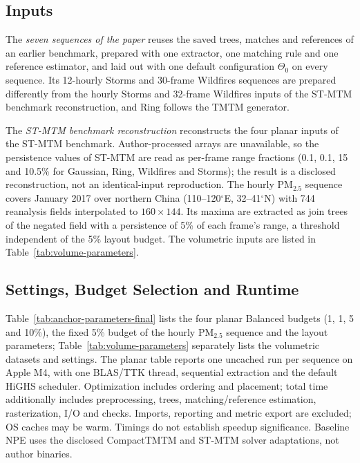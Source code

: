 \documentclass[preprint]{vgtc}   %
\begin{document}
\subsection{Inputs}\label{sec:dataprep}
The \emph{seven sequences of the paper} reuses the saved trees, matches and references of an earlier benchmark, prepared with one extractor, one matching rule and one reference estimator, and laid out with one default configuration $\Theta_0$ on every sequence. Its 12-hourly Storms and 30-frame Wildfires sequences are prepared differently from the hourly Storms and 32-frame Wildfires inputs of the ST-MTM benchmark reconstruction, and Ring follows the TMTM generator.

The \emph{ST-MTM benchmark reconstruction} reconstructs the four planar inputs of the ST-MTM benchmark. Author-processed arrays are unavailable, so the persistence values of ST-MTM are read as per-frame range fractions (0.1, 0.1, 15 and 10.5\% for Gaussian, Ring, Wildfires and Storms); the result is a disclosed reconstruction, not an identical-input reproduction. The hourly PM$_{2.5}$ sequence covers January 2017 over northern China (110--120$^\circ$E, 32--41$^\circ$N) with 744 reanalysis fields interpolated to $160\times144$. Its maxima are extracted as join trees of the negated field with a persistence of 5\% of each frame's range, a threshold independent of the 5\% layout budget. The volumetric inputs are listed in Table~\ref{tab:volume-parameters}.



\subsection{Settings, Budget Selection and Runtime}\label{sec:settings}


Table~\ref{tab:anchor-parameters-final} lists the four planar Balanced budgets (1, 1, 5 and 10\%), the fixed 5\% budget of the hourly PM$_{2.5}$ sequence and the layout parameters; Table~\ref{tab:volume-parameters} separately lists the volumetric datasets and settings. The planar table reports one uncached run per sequence on Apple M4, with one BLAS/TTK thread, sequential extraction and the default HiGHS scheduler. Optimization includes ordering and placement; total time additionally includes preprocessing, trees, matching/reference estimation, rasterization, I/O and checks. Imports, reporting and metric export are excluded; OS caches may be warm. Timings do not establish speedup significance. Baseline NPE uses the disclosed CompactTMTM and ST-MTM solver adaptations, not author binaries.
\end{document}
